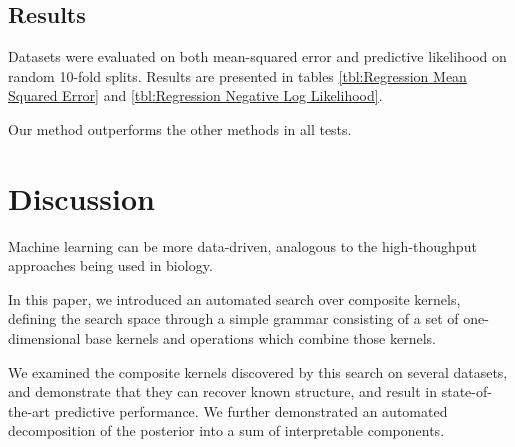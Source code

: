 \documentclass[twoside]{article}
\begin{document}
\subsection{Results}

Datasets were evaluated on both mean-squared error and predictive likelihood on random 10-fold splits.
Results are presented in tables \ref{tbl:Regression Mean Squared Error} and \ref{tbl:Regression Negative Log Likelihood}.
%


%
Our method outperforms the other methods in all tests. 

\section{Discussion}

Machine learning can be more data-driven, analogous to the high-thoughput approaches being used in biology. 

In this paper, we introduced an automated search over composite kernels, defining the search space through a simple grammar consisting of a set of one-dimensional base kernels and operations which combine those kernels.

We examined the composite kernels discovered by this search on several datasets, and demonstrate that they can recover known structure, and result in state-of-the-art predictive performance.  We further demonstrated an automated decomposition of the posterior into a sum of interpretable components.
\end{document}
